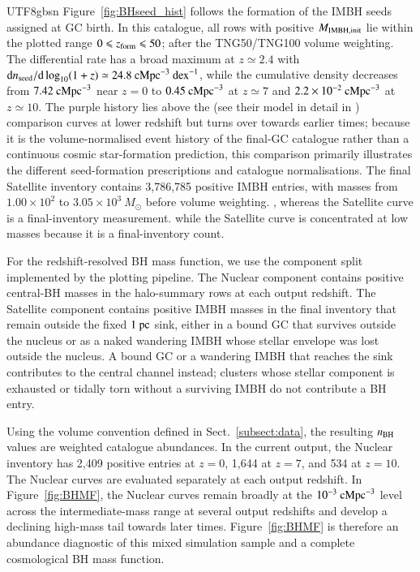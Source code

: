 \documentclass[trackchanges, twocolappendix, twocolumn]{aastex701}
\begin{document}
\begin{CJK*}{UTF8}{gbsn}
Figure~\ref{fig:BHseed_hist} follows the formation of the IMBH seeds assigned at GC birth. In this catalogue, all rows with positive $M_{\rm IMBH, init}$ lie within the plotted range $0 \leqslant z_{\rm form} \leqslant 50$; after the TNG50/TNG100 volume weighting. The differential rate has a broad maximum at $z\simeq2.4$ with ${\rm d} n_{\rm seed}/{\rm d} \log_{10}(1+z)\simeq24.8~{\rm cMpc}^{-3}~{\rm dex}^{-1}$, while the cumulative density decreases from $7.42~{\rm cMpc}^{-3}$ near $z=0$ to $0.45~{\rm cMpc}^{-3}$ at $z\simeq7$ and $2.2\times10^{-2}~{\rm cMpc}^{-3}$ at $z\simeq10$. The purple history lies above the \cite{Chen+2025bTwoGFM} (see their model in detail in \cite{Mo+2024TwoGFM, Chen+2024TwoGFM, Chen+2025aTwoGFM}) comparison curves at lower redshift but turns over towards earlier times; because it is the volume-normalised event history of the final-GC catalogue rather than a continuous cosmic star-formation prediction, this comparison primarily illustrates the different seed-formation prescriptions and catalogue normalisations. The final Satellite inventory contains 3,786,785 positive IMBH entries, with masses from $1.00\times10^2$ to $3.05\times10^3~M_\odot$ before volume weighting. , whereas the Satellite curve is a final-inventory measurement. while the Satellite curve is concentrated at low masses because it is a final-inventory count.

For the redshift-resolved BH mass function, we use the component split implemented by the plotting pipeline. The Nuclear component contains positive central-BH masses in the halo-summary rows at each output redshift. The Satellite component contains positive IMBH masses in the final inventory that remain outside the fixed $1~{\rm pc}$ sink, either in a bound GC that survives outside the nucleus or as a naked wandering IMBH whose stellar envelope was lost outside the nucleus. A bound GC or a wandering IMBH that reaches the sink contributes to the central channel instead; clusters whose stellar component is exhausted or tidally torn without a surviving IMBH do not contribute a BH entry.

Using the volume convention defined in Sect.~\ref{subsect:data}, the resulting $n_{\rm BH}$ values are weighted catalogue abundances. In the current output, the Nuclear inventory has 2,409 positive entries at $z=0$, 1,644 at $z=7$, and 534 at $z=10$. The Nuclear curves are evaluated separately at each output redshift. In Figure~\ref{fig:BHMF}, the Nuclear curves remain broadly at the $10^{-3}~{\rm cMpc}^{-3}$ level across the intermediate-mass range at several output redshifts and develop a declining high-mass tail towards later times. Figure~\ref{fig:BHMF} is therefore an abundance diagnostic of this mixed simulation sample and a complete cosmological BH mass function.


\end{CJK*}
\end{document}
